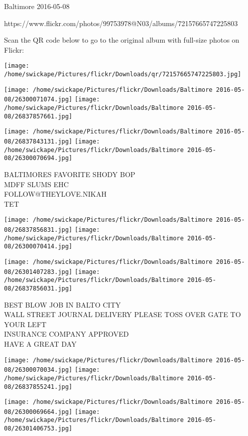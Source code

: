 \documentclass[10pt,letterpaper]{article}
\begin{document}
Baltimore 2016-05-08

https://www.flickr.com/photos/99753978@N03/albums/72157665747225803

Scan the QR code below to go to the original album with full-size photos on Flickr:

\texttt{[image: /home/swickape/Pictures/flickr/Downloads/qr/72157665747225803.jpg]}
\pagebreak

\texttt{[image: /home/swickape/Pictures/flickr/Downloads/Baltimore 2016-05-08/26300071074.jpg]}
\texttt{[image: /home/swickape/Pictures/flickr/Downloads/Baltimore 2016-05-08/26837857661.jpg]}

\texttt{[image: /home/swickape/Pictures/flickr/Downloads/Baltimore 2016-05-08/26837843131.jpg]}
\texttt{[image: /home/swickape/Pictures/flickr/Downloads/Baltimore 2016-05-08/26300070694.jpg]}

BALTIMORES FAVORITE SHODY BOP\\
MDFF SLUMS EHC\\
FOLLOW@THEYLOVE.NIKAH\\
TET\\
\pagebreak

\texttt{[image: /home/swickape/Pictures/flickr/Downloads/Baltimore 2016-05-08/26837856831.jpg]}
\texttt{[image: /home/swickape/Pictures/flickr/Downloads/Baltimore 2016-05-08/26300070414.jpg]}

\texttt{[image: /home/swickape/Pictures/flickr/Downloads/Baltimore 2016-05-08/26301407283.jpg]}
\texttt{[image: /home/swickape/Pictures/flickr/Downloads/Baltimore 2016-05-08/26837856031.jpg]}

BEST BLOW JOB IN BALTO CITY\\
WALL STREET JOURNAL DELIVERY PLEASE TOSS OVER GATE TO YOUR LEFT\\
INSURANCE COMPANY APPROVED\\
HAVE A GREAT DAY\\
\pagebreak

\texttt{[image: /home/swickape/Pictures/flickr/Downloads/Baltimore 2016-05-08/26300070034.jpg]}
\texttt{[image: /home/swickape/Pictures/flickr/Downloads/Baltimore 2016-05-08/26837855241.jpg]}

\texttt{[image: /home/swickape/Pictures/flickr/Downloads/Baltimore 2016-05-08/26300069664.jpg]}
\texttt{[image: /home/swickape/Pictures/flickr/Downloads/Baltimore 2016-05-08/26301406753.jpg]}
\end{document}

